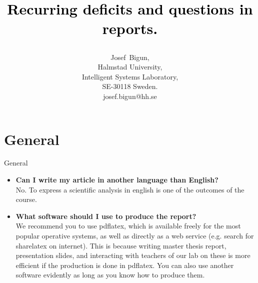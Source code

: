 \documentclass[pdf]{beamer}
\begin{document}


\title{\textcolor{black}{\strut  Recurring  deficits and questions in
    reports.}}
\author{
       Josef~Bigun,%
\\
  Halmstad University, \\Intelligent Systems Laboratory, \\ SE-30118 Sweden.\\
  josef.bigun@hh.se%
}
\date{ }

\begin{frame}
\maketitle  %
\end{frame}

\section {General}
\begin{frame}{General}
\begin{itemize}
\item {\bf  Can I write my article in another language than English?}\\
     No. To 
     express a scientific analysis in english is one of the outcomes
     of the course.
\item {\bf  What software should I use to produce the report?}\\
We recommend you to use pdflatex, which is available freely for the
most popular operative systems, as well as  directly as a web service
(e.g. search for sharelatex on internet). This is because writing  master
thesis report, presentation slides, and interacting with teachers of
our lab on these is  more
efficient if the production is done in pdflatex. You can also use
another software evidently as long as you know how to produce them.
\end{itemize} 
\end{frame}
\end{document}
